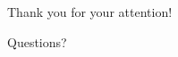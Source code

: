 \documentclass[aspectratio=169]{beamer}
\begin{document}
\begin{frame}
    \centering
    \LARGE Thank you for your attention!
    
    \vspace{1cm}
    
    \large Questions?

    
    \begin{center}
    \end{center}

        
\end{frame}
\end{document}
